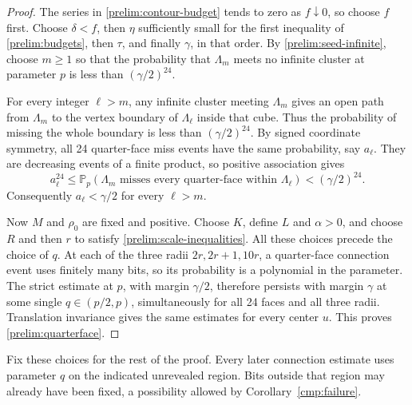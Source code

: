 \begin{proof}
The series in \eqref{prelim:contour-budget} tends to zero as $f\downarrow0$,
so choose $f$ first. Choose $\delta<f$, then $\eta$ sufficiently small for
the first inequality of \eqref{prelim:budgets}, then $\tau$, and finally
$\gamma$, in that order. By \eqref{prelim:seed-infinite}, choose $m\ge1$
so that the probability that $\Lambda_m$ meets no infinite cluster at
parameter $p$ is less than $(\gamma/2)^{24}$.

For every integer $\ell>m$, any infinite cluster meeting $\Lambda_m$
gives an open path from $\Lambda_m$ to the vertex boundary of $\Lambda_\ell$
inside that cube. Thus the probability of missing the whole boundary is less
than $(\gamma/2)^{24}$. By signed coordinate symmetry, all 24 quarter-face
miss events have the same probability, say $a_\ell$. They are decreasing
events of a finite product, so positive association gives
\[
 a_\ell^{24}\le
 \mathbb P_p(\Lambda_m\text{ misses every quarter-face within }\Lambda_\ell)
 <(\gamma/2)^{24}.
\]
Consequently $a_\ell<\gamma/2$ for every $\ell>m$.

Now $M$ and $\rho_0$ are fixed and positive. Choose $K$, define $L$ and
$\alpha>0$, and choose $R$ and then $r$ to satisfy
\eqref{prelim:scale-inequalities}. All these choices precede the choice of
$q$. At each of the three radii $2r,2r+1,10r$, a quarter-face connection
event uses finitely many bits, so its probability is a polynomial in the
parameter. The strict estimate at $p$, with margin $\gamma/2$, therefore
persists with margin $\gamma$ at some single $q\in(p/2,p)$, simultaneously
for all 24 faces and all three radii. Translation invariance gives the same
estimates for every center $u$. This proves \eqref{prelim:quarterface}.
\end{proof}

Fix these choices for the rest of the proof. Every later connection estimate
uses parameter $q$ on the indicated unrevealed region. Bits outside that region
may already have been fixed, a possibility allowed by
Corollary~\ref{cmp:failure}.
